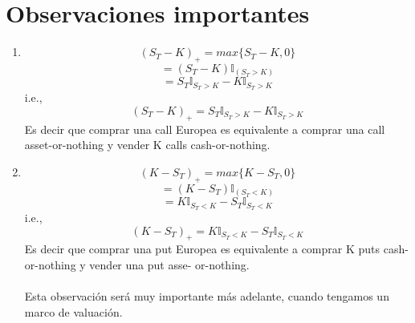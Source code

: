 \documentclass[12pts]{extarticle}
\begin{document}
\section{Observaciones importantes} 
\begin{enumerate}
\item $$(S_T-K)_+=max\{S_T-K,0\}$$  
$$=(S_T-K)\mathbb{I}_{(S_T>K)}$$  
$$=S_T \mathbb{I}_{S_T>K}- K \mathbb{I}_{S_T>K}$$
i.e., 
$$(S_T-K)_+=S_T \mathbb{I}_{S_T>K}- K \mathbb{I}_{S_T>K}$$
Es decir que comprar una call Europea es equivalente a comprar una call asset-or-nothing y vender K calls cash-or-nothing.
\item $$(K-S_T)_+=max\{K-S_T,0\}$$  
$$=(K-S_T)\mathbb{I}_{(S_T<K)}$$  
$$=K\mathbb{I}_{S_T<K}- S_T \mathbb{I}_{S_T<K}$$
i.e., 
$$(K-S_T)_+=K \mathbb{I}_{S_T<K}- S_T \mathbb{I}_{S_T<K}$$
Es decir que comprar una put Europea es equivalente a comprar K puts cash-or-nothing y vender una put asse- or-nothing. 
\\ \\
Esta observación será muy importante más adelante, cuando tengamos un marco de valuación. 
\end{enumerate}
\end{document}
